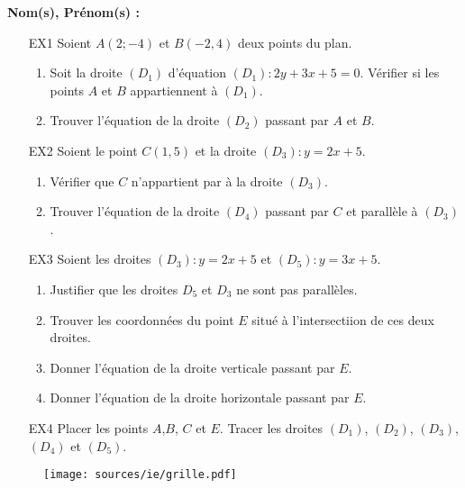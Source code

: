 \documentclass[11pt]{article}
\begin{document}

\setlength{\columnseprule}{1pt}

\textbf{Nom(s), Prénom(s) :}

\begin{multicols}{2}


  \begin{enumerate}
  \item[EX1] Soient $A(2; -4)$ et $B(-2, 4)$ deux points du plan.

    \begin{enumerate}
    \item Soit la droite $(D_1)$ d'équation $(D_1) : 2y + 3x + 5 = 0$. Vérifier si les points $A$ et $B$ appartiennent à $(D_1)$.
    \item Trouver l'équation de la droite $(D_2)$ passant par $A$ et $B$.
    \end{enumerate}

  \item[EX2] Soient le point $C(1, 5)$ et la droite $(D_3) : y = 2x + 5$.

    \begin{enumerate}
    \item Vérifier que $C$ n'appartient par à la droite $(D_3)$.
    \item Trouver l'équation de la droite $(D_4)$ passant par $C$ et parallèle à $(D_3)$.
    \end{enumerate}

  \item[EX3] Soient les droites $(D_3) : y = 2x + 5$ et $(D_5) : y = 3x + 5$.

    \begin{enumerate}
    \item Justifier que les droites $D_5$ et $D_3$ ne sont pas parallèles.
    \item Trouver les coordonnées du point $E$ situé à l'intersectiion de ces deux droites.
    \item Donner l'équation de la droite verticale passant par $E$.
    \item Donner l'équation de la droite horizontale passant par $E$.
    \end{enumerate}


  \item[EX4] Placer les points $A$,$B$, $C$ et $E$. Tracer les droites $(D_1)$, $(D_2)$, $(D_3)$, $(D_4)$ et $(D_5)$.
  \end{enumerate}

  \begin{figure}[H]
    \centering
    \texttt{[image: sources/ie/grille.pdf]}
  \end{figure}

\end{multicols}
\end{document}
